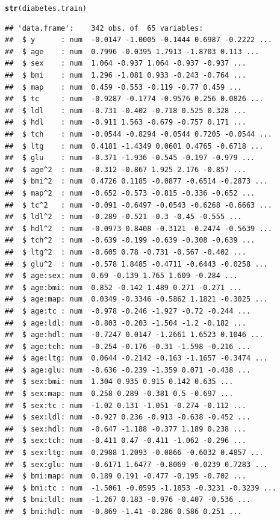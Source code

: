 \documentclass[]{beamer}\usepackage[]{graphicx}\usepackage[]{color}
\makeatletter
\newcommand{\hlstd}[1]{\textcolor[rgb]{0.345,0.345,0.345}{#1}}%
\newcommand{\hlkwd}[1]{\textcolor[rgb]{0.737,0.353,0.396}{\textbf{#1}}}%
\newenvironment{kframe}{%
 \def\at@end@of@kframe{}%
 \ifinner\ifhmode%
  \def\at@end@of@kframe{\end{minipage}}%
  \begin{minipage}{\columnwidth}%
 \fi\fi%
 \def\FrameCommand##1{\hskip\@totalleftmargin \hskip-\fboxsep
 \colorbox{shadecolor}{##1}\hskip-\fboxsep
     \hskip-\linewidth \hskip-\@totalleftmargin \hskip\columnwidth}%
 \MakeFramed {\advance\hsize-\width
   \@totalleftmargin\z@ \linewidth\hsize
   \@setminipage}}%
 {\par\unskip\endMakeFramed%
 \at@end@of@kframe}
\newenvironment{knitrout}{}{} %
\makeatother
\begin{document}
\begin{frame}[fragile]
\begin{knitrout}
\begin{kframe}
\begin{alltt}
\hlkwd{str}\hlstd{(diabetes.train)}
\end{alltt}
\begin{verbatim}
## 'data.frame':	342 obs. of  65 variables:
##  $ y      : num  -0.0147 -1.0005 -0.1444 0.6987 -0.2222 ...
##  $ age    : num  0.7996 -0.0395 1.7913 -1.8703 0.113 ...
##  $ sex    : num  1.064 -0.937 1.064 -0.937 -0.937 ...
##  $ bmi    : num  1.296 -1.081 0.933 -0.243 -0.764 ...
##  $ map    : num  0.459 -0.553 -0.119 -0.77 0.459 ...
##  $ tc     : num  -0.9287 -0.1774 -0.9576 0.256 0.0826 ...
##  $ ldl    : num  -0.731 -0.402 -0.718 0.525 0.328 ...
##  $ hdl    : num  -0.911 1.563 -0.679 -0.757 0.171 ...
##  $ tch    : num  -0.0544 -0.8294 -0.0544 0.7205 -0.0544 ...
##  $ ltg    : num  0.4181 -1.4349 0.0601 0.4765 -0.6718 ...
##  $ glu    : num  -0.371 -1.936 -0.545 -0.197 -0.979 ...
##  $ age^2  : num  -0.312 -0.867 1.925 2.176 -0.857 ...
##  $ bmi^2  : num  0.4726 0.1185 -0.0877 -0.6514 -0.2873 ...
##  $ map^2  : num  -0.652 -0.573 -0.815 -0.336 -0.652 ...
##  $ tc^2   : num  -0.091 -0.6497 -0.0543 -0.6268 -0.6663 ...
##  $ ldl^2  : num  -0.289 -0.521 -0.3 -0.45 -0.555 ...
##  $ hdl^2  : num  -0.0973 0.8408 -0.3121 -0.2474 -0.5639 ...
##  $ tch^2  : num  -0.639 -0.199 -0.639 -0.308 -0.639 ...
##  $ ltg^2  : num  -0.605 0.78 -0.731 -0.567 -0.402 ...
##  $ glu^2  : num  -0.578 1.8485 -0.4711 -0.6443 -0.0258 ...
##  $ age:sex: num  0.69 -0.139 1.765 1.609 -0.284 ...
##  $ age:bmi: num  0.852 -0.142 1.489 0.271 -0.271 ...
##  $ age:map: num  0.0349 -0.3346 -0.5862 1.1821 -0.3025 ...
##  $ age:tc : num  -0.978 -0.246 -1.927 -0.72 -0.244 ...
##  $ age:ldl: num  -0.803 -0.203 -1.504 -1.2 -0.182 ...
##  $ age:hdl: num  -0.7247 0.0147 -1.2661 1.6523 0.1046 ...
##  $ age:tch: num  -0.254 -0.176 -0.31 -1.598 -0.216 ...
##  $ age:ltg: num  0.0644 -0.2142 -0.163 -1.1657 -0.3474 ...
##  $ age:glu: num  -0.636 -0.239 -1.359 0.071 -0.438 ...
##  $ sex:bmi: num  1.304 0.935 0.915 0.142 0.635 ...
##  $ sex:map: num  0.258 0.289 -0.381 0.5 -0.697 ...
##  $ sex:tc : num  -1.02 0.131 -1.051 -0.274 -0.112 ...
##  $ sex:ldl: num  -0.927 0.236 -0.913 -0.638 -0.452 ...
##  $ sex:hdl: num  -0.647 -1.188 -0.377 1.189 0.238 ...
##  $ sex:tch: num  -0.411 0.47 -0.411 -1.062 -0.296 ...
##  $ sex:ltg: num  0.2988 1.2093 -0.0866 -0.6032 0.4857 ...
##  $ sex:glu: num  -0.6171 1.6477 -0.8069 -0.0239 0.7283 ...
##  $ bmi:map: num  0.189 0.191 -0.477 -0.195 -0.702 ...
##  $ bmi:tc : num  -1.5061 -0.0595 -1.1853 -0.3231 -0.3239 ...
##  $ bmi:ldl: num  -1.267 0.183 -0.976 -0.407 -0.536 ...
##  $ bmi:hdl: num  -0.869 -1.41 -0.286 0.586 0.251 ...

\end{verbatim}
\end{kframe}
\end{knitrout}
\end{frame}
\end{document}
